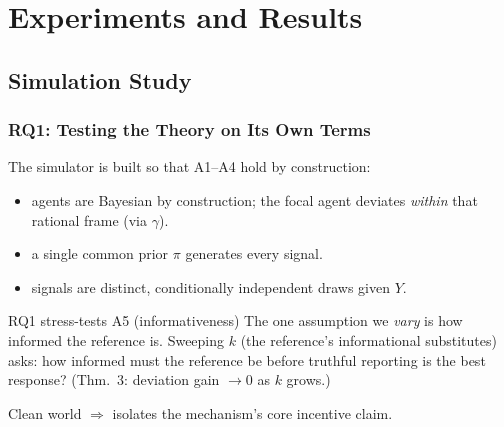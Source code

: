 \documentclass[
	11pt, %
]{beamer}
\begin{document}

\section{Experiments and Results}

\subsection{Simulation Study}

\begin{frame}
	\frametitle{RQ1: Testing the Theory on Its Own Terms}
	\small
	The simulator is built so that \alert{A1--A4 hold by construction}:
	\begin{itemize}
		\setlength{\itemsep}{0.3em}
		\item[\textbf{A1}] agents are Bayesian by construction; the focal agent deviates \emph{within} that rational frame (via $\gamma$).
		\item[\textbf{A2}] a single common prior $\pi$ generates every signal.
		\item[\textbf{A3--A4}] signals are distinct, conditionally independent draws given $Y$.
	\end{itemize}

	\begin{block}{RQ1 stress-tests A5 (informativeness)}
		The one assumption we \emph{vary} is how informed the reference is. Sweeping $k$ (the reference's informational substitutes) asks: how informed must the reference be before truthful reporting is the best response? (Thm.~3: deviation gain $\to 0$ as $k$ grows.)
	\end{block}

	\centering
	\alert{Clean world $\Rightarrow$ isolates the mechanism's core incentive claim.}
\end{frame}
\end{document}
